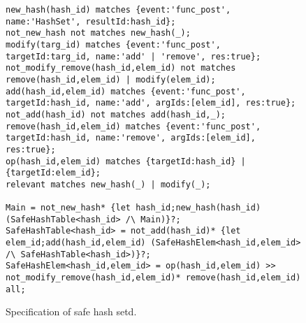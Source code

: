 \begin{figure}[h]
\begin{lstlisting}[basicstyle=\ttfamily\scriptsize]
new_hash(hash_id) matches {event:'func_post', name:'HashSet', resultId:hash_id};
not_new_hash not matches new_hash(_);
modify(targ_id) matches {event:'func_post', targetId:targ_id, name:'add' | 'remove', res:true};
not_modify_remove(hash_id,elem_id) not matches remove(hash_id,elem_id) | modify(elem_id);
add(hash_id,elem_id) matches {event:'func_post', targetId:hash_id, name:'add', argIds:[elem_id], res:true};
not_add(hash_id) not matches add(hash_id,_);
remove(hash_id,elem_id) matches {event:'func_post', targetId:hash_id, name:'remove', argIds:[elem_id], res:true};
op(hash_id,elem_id) matches {targetId:hash_id} | {targetId:elem_id};
relevant matches new_hash(_) | modify(_);

Main = not_new_hash* {let hash_id;new_hash(hash_id) (SafeHashTable<hash_id> /\ Main)}?;
SafeHashTable<hash_id> = not_add(hash_id)* {let elem_id;add(hash_id,elem_id) (SafeHashElem<hash_id,elem_id> /\ SafeHashTable<hash_id>)}?;
SafeHashElem<hash_id,elem_id> = op(hash_id,elem_id) >> not_modify_remove(hash_id,elem_id)* remove(hash_id,elem_id) all;
\end{lstlisting}
\caption{Specification of safe hash setd.}\label{list:hash}
\end{figure}

